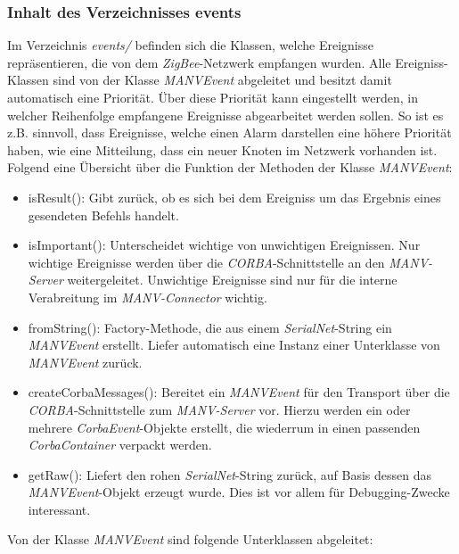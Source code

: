     \subsubsection{Inhalt des Verzeichnisses events}
    
    Im Verzeichnis \emph{events/} befinden sich die Klassen, welche Ereignisse repräsentieren, die von dem \emph{ZigBee}-Netzwerk
    empfangen wurden. Alle Ereigniss-Klassen sind von der Klasse \emph{MANVEvent} abgeleitet und besitzt damit automatisch eine
    Priorität. Über diese Priorität kann eingestellt werden, in welcher Reihenfolge empfangene Ereignisse abgearbeitet werden
    sollen. So ist es z.B. sinnvoll, dass Ereignisse, welche einen Alarm darstellen eine höhere Priorität haben, wie eine 
    Mitteilung, dass ein neuer Knoten im Netzwerk vorhanden ist. Folgend eine Übersicht über die
    Funktion der Methoden der Klasse \emph{MANVEvent}:

    \begin{itemize}
            \item{isResult():} Gibt zurück, ob es sich bei dem Ereigniss um das Ergebnis eines gesendeten Befehls handelt. 
            \item{isImportant():} Unterscheidet wichtige von unwichtigen Ereignissen. Nur wichtige Ereignisse werden über die \emph{CORBA}-Schnittstelle
                            an den \emph{MANV-Server} weitergeleitet. Unwichtige Ereignisse sind nur für die interne Verabreitung im 
                            \emph{MANV-Connector} wichtig. 
            \item{fromString():}  Factory-Methode, die aus einem \emph{SerialNet}-String ein \emph{MANVEvent} erstellt. Liefer automatisch eine
                            Instanz einer Unterklasse von \emph{MANVEvent} zurück.
            \item{createCorbaMessages():} Bereitet ein \emph{MANVEvent} für den Transport über die \emph{CORBA}-Schnittstelle zum \emph{MANV-Server}
                                    vor. Hierzu werden ein oder mehrere \emph{CorbaEvent}-Objekte erstellt, die wiederrum in einen
                                    passenden \emph{CorbaContainer} verpackt werden.
            \item{getRaw():} Liefert den rohen \emph{SerialNet}-String zurück, auf Basis dessen das \emph{MANVEvent}-Objekt erzeugt wurde.
                          Dies ist vor allem für Debugging-Zwecke interessant.
    \end{itemize}

    Von der Klasse \emph{MANVEvent} sind folgende Unterklassen abgeleitet:


